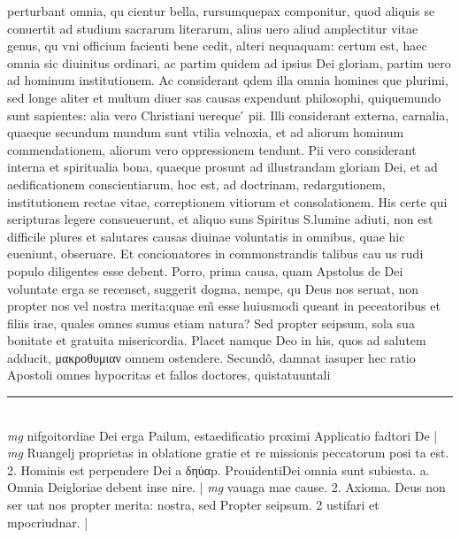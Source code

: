 \documentclass{article}
\begin{document}
\begin{pages}
perturbant omnia, qu cientur bella, rursumquepax componitur, quod aliquis se conuertit ad studium sacrarum literarum, alius uero aliud amplectitur vitae genus, qu vni officium facienti bene cedit, alteri nequaquam: certum est, haec omnia sic diuinitus ordinari, ac partim quidem ad ipsius Dei gloriam, partim uero ad hominum institutionem. Ac considerant qdem illa omnia homines que  plurimi, sed longe aliter et multum diuer sas causas expendunt philosophi, quiquemundo sunt sapientes: alia vero Christiani uereque ́ pii. Illi considerant externa, carnalia, quaeque  secundum mundum sunt vtilia velnoxia, et ad aliorum hominum commendationem, aliorum vero oppressionem tendunt. Pii vero considerant interna et spiritualia bona, quaeque  prosunt ad illustrandam gloriam Dei, et ad aedificationem conscientiarum, hoc est, ad doctrinam, redargutionem, institutionem rectae vitae, correptionem vitiorum et consolationem. His certe qui seripturas legere consueuerunt, et aliquo suns Spiritus S.lumine adiuti, non est difficile plures et salutares causas diuinae voluntatis in omnibus, quae hic eueniunt, obseruare. Et concionatores in commonstrandis talibus cau us rudi populo diligentes esse debent. Porro, prima causa, quam Apstolus de Dei voluntate erga se recenset, suggerit dogma, nempe, qu Deus nos seruat, non propter nos vel nostra merita:quae em̃ esse huiusmodi queant in peceatoribus et filiis irae, quales omnes sumus etiam natura? Sed propter seipsum, sola sua bonitate et gratuita misericordia. Placet namque  Deo in his, quos ad salutem adducit, μακροθυμιαν omnem ostendere. Secundô, damnat iasuper hec ratio Apostoli omnes hypocritas et fallos doctores, quistatuuntali\pend
\vspace{0.5cm}\noindent
\vspace{0.2cm}\rule{1cm}{0.2pt}\\ 
\hspace{0.2cm}\textit{mg}
\footnotesize nifgoitordiae Dei erga Pailum, estaedificatio proximi Applicatio fadtori De 
\normalsize| 
\hspace{0.2cm}\textit{mg}
\footnotesize Ruangelj proprietas in oblatione gratie et re missionis peccatorum posi ta est. 2. Hominis est perpendere Dei a δηύαp. ProuidentiDei omnia sunt subiesta. a. Omnia Deigloriae debent inse nire. 
\normalsize| 
\hspace{0.2cm}\textit{mg}
\footnotesize vauaga mae cause. 2. Axioma. Deus non ser uat nos propter merita: nostra, sed Propter seipsum. 2 ustifari et mpocriudnar. 
\normalsize| 

\end{pages}
\end{document}
